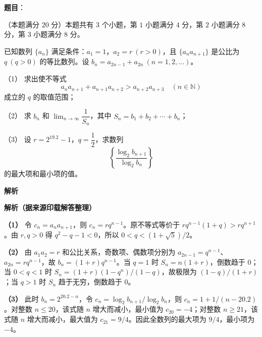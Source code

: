 \begin{answer}

\textbf{题目}：

（本题满分 $20$ 分）本题共有 $3$ 个小题，第 $1$ 小题满分 $4$ 分，第 $2$ 小题满分 $8$ 分，第 $3$ 小题满分 $8$ 分。

已知数列 $\{a_n\}$ 满足条件：$a_1=1$，$a_2=r\ (r>0)$，且 $\{a_na_{n+1}\}$ 是公比为 $q\ (q>0)$ 的等比数列。设 $b_n=a_{2n-1}+a_{2n}\ (n=1,2,\ldots)$。

（1） 求出使不等式
\nopagebreak[4]
\[
a_na_{n+1}+a_{n+1}a_{n+2}>a_{n+2}a_{n+3}\quad(n\in\mathbb N)
\]
成立的 $q$ 的取值范围；

（2） 求 $b_n$ 和 $\displaystyle\lim_{n\to\infty}\dfrac1{S_n}$，其中 $S_n=b_1+b_2+\cdots+b_n$；

（3） 设 $r=2^{19.2}-1$，$q=\dfrac12$，求数列
\nopagebreak[4]
\[
\left\{\frac{\log_2 b_{n+1}}{\log_2 b_n}\right\}
\]
的最大项和最小项的值。

\textbf{解析}

\textbf{解析（据来源印载解答整理）}

\textbf{（1）} 令 $c_n=a_na_{n+1}$，则 $c_n=rq^{n-1}$。原不等式等价于 $rq^{n-1}(1+q)>rq^{n+1}$。由 $r,q>0$ 得 $q^2-q-1<0$，所以 $0<q<(1+\sqrt5)/2$。

\textbf{（2）} 由 $a_1a_2=r$ 和公比关系，奇数项、偶数项分别为 $a_{2n-1}=q^{n-1}$、$a_{2n}=rq^{n-1}$，故 $b_n=(1+r)q^{n-1}$。当 $q=1$ 时 $S_n=n(1+r)$，倒数趋于 $0$；当 $0<q<1$ 时 $S_n=(1+r)(1-q^n)/(1-q)$，故极限为 $(1-q)/(1+r)$；当 $q>1$ 时 $S_n$ 趋于无穷，倒数趋于 $0$。

\textbf{（3）} 此时 $b_n=2^{20.2-n}$，令 $c_n=\log_2b_{n+1}/\log_2b_n$，则 $c_n=1+1/(n-20.2)$。对整数 $n\le20$，该式随 $n$ 增大而减小，最小值为 $c_{20}=-4$；对整数 $n\ge21$，该式随 $n$ 增大而减小，最大值为 $c_{21}=9/4$。因此全数列的最大项为 $9/4$，最小项为 $-4$。




\end{answer}